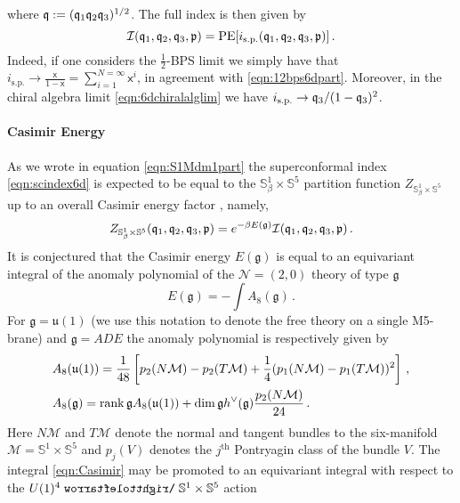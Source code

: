 \documentclass[main.tex]{subfiles}
\begin{document}
where $\mathfrak{q}:=(\mathfrak{q}_1\mathfrak{q}_2\mathfrak{q}_3)^{1/2}$.
The full index is then given by
\begin{equation}
\mathcal{I}(\mathfrak{q}_1,\mathfrak{q}_2,\mathfrak{q}_3,\mathfrak{p})=\operatorname{\mathrm{PE}}[i_{\text{s.p.}}(\mathfrak{q}_1,\mathfrak{q}_2,\mathfrak{q}_3,\mathfrak{p})]\,.
\end{equation}
Indeed, if one considers the $\frac{1}{2}$-BPS limit we simply have that $i_{\text{s.p.}}\to\frac{\mathsf{x}}{1-\mathsf{x}}=\sum_{i=1}^{N=\infty}\mathsf{x}^i$, in agreement with \eqref{eqn:12bps6dpart}.  Moreover, in the chiral algebra limit \eqref{eqn:6dchiralalglim} we have $i_{\text{s.p.}}\to \mathfrak{q}_3/(1-\mathfrak{q}_3)^2$.

\paragraph{Casimir Energy}
As we wrote in equation \eqref{eqn:S1Mdm1part} the superconformal index \eqref{eqn:scindex6d} is expected to be equal to the $\mathbb{S}^1_{\beta}\times \mathbb{S}^5$ partition function $Z_{\mathbb{S}^1_{\beta}\times \mathbb{S}^5}$ up to an overall Casimir energy factor \cite{Benini:2011nc,Bobev:2015kza,Kim:2012qf,Kim:2012ava}, namely,
\begin{equation}
Z_{\mathbb{S}^1_{\beta}\times\mathbb{S}^5}(\mathfrak{q}_1,\mathfrak{q}_2,\mathfrak{q}_3,\mathfrak{p})=e^{-\beta E(\mathfrak{g})}\mathcal{I}(\mathfrak{q}_1,\mathfrak{q}_2,\mathfrak{q}_3,\mathfrak{p})\,.
\end{equation}
It is conjectured that the Casimir energy $E(\mathfrak{g})$ is equal to an equivariant integral of the anomaly polynomial of the $\mathcal{N}=(2,0)$ theory of type $\mathfrak{g}$ \cite{Bobev:2015kza}
\begin{equation}\label{eqn:Casimir}
E(\mathfrak{g})=-\int A_8(\mathfrak{g})\,.
\end{equation}
For $\mathfrak{g}=\mathfrak{u}(1)$ (we use this notation to denote the free theory on a single M5-brane) and $\mathfrak{g}=ADE$ the anomaly polynomial is respectively given by \cite{Yi:2001bz,Intriligator:2000eq,Harvey:1998bx}
\begin{align}
&A_8(\mathfrak{u}(1))=\frac{1}{48}\left[p_2(N\mathcal{M})-p_2(T\mathcal{M})+\frac{1}{4}(p_1(N\mathcal{M})-p_1(T\mathcal{M}))^2\right]\,,\\
&A_8(\mathfrak{g})=\operatorname{rank}\mathfrak{g}A_8(\mathfrak{u}(1))+\dim\mathfrak{g}h^{\vee}(\mathfrak{g})\frac{p_2(N\mathcal{M})}{24}\,.
\end{align}
Here $N\mathcal{M}$ and $T\mathcal{M}$ denote the normal and tangent bundles to the six-manifold $\mathcal{M}=\mathbb{S}^1\times \mathbb{S}^5$ and $p_j(V)$ denotes the $j^{\text{th}}$ Pontryagin class of the bundle $V$.  The integral \eqref{eqn:Casimir} may be promoted to an equivariant integral with respect to the $U(1)^4\acts \mathbb{S}^1\times \mathbb{S}^5$ action \cite{Bobev:2015kza}
\end{document}

